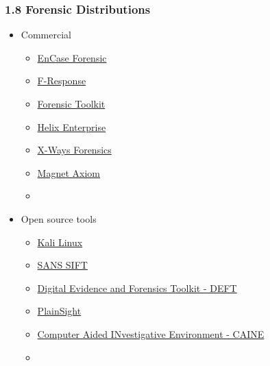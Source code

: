 \begin{frame}
  \frametitle{1.8 Forensic Distributions}
  \begin{itemize}
      \item Commercial
        \begin{itemize}
            \item[] \href{https://www.guidancesoftware.com/encase-forensic}{EnCase Forensic}
            \item[] \href{https://www.f-response.com/}{F-Response}
            \item[] \href{https://accessdata.com/products-services/forensic-toolkit-ftk}{Forensic Toolkit}
            \item[] \href{http://www.e-fense.com/products.php}{Helix Enterprise}
            \item[] \href{http://www.x-ways.net/forensics/index-d.html}{X-Ways Forensics}
            \item[] \href{https://www.magnetforensics.com/magnet-axiom/}{Magnet Axiom}
            \item[]
        \end{itemize}
      \item Open source tools
        \begin{itemize}
            \item[] \href{https://www.kali.org/}{Kali Linux}
            \item[] \href{https://digital-forensics.sans.org/community/downloads}{SANS SIFT}
            \item[] \href{http://www.deftlinux.net/}{Digital Evidence and Forensics Toolkit - DEFT}
            \item[] \href{http://www.plainsight.info/}{PlainSight}
            \item[] \href{https://www.caine-live.net/}{Computer Aided INvestigative Environment - CAINE}
            \item[]
        \end{itemize}
  \end{itemize}
\end{frame}



